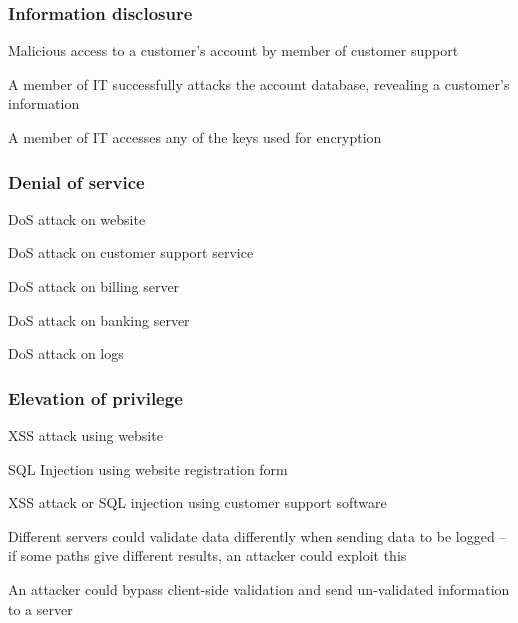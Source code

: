 \subsubsection{Information disclosure}

\begin{numbered}[resume]
    \item \label{disclosureCustomerSupport} Malicious access to a customer's account by member of customer support
    
    \item \label{disclosureItDetails} A member of IT successfully attacks the account database, revealing a customer's information

    \item \label{disclosureItKeys} A member of IT accesses any of the keys used for encryption
\end{numbered}

\subsubsection{Denial of service}

\begin{numbered}[resume]
    \item \label{dosWebsite} DoS attack on website
    \item \label{dosCustomerSupport} DoS attack on customer support service
    \item \label{dosBillingServer} DoS attack on billing server
    \item \label{dosBankingServer} DoS attack on banking server
    \item \label{dosLogs} DoS attack on logs
\end{numbered}

\subsubsection{Elevation of privilege}

\begin{numbered}[resume]
    \item \label{eopXss} XSS attack using website
    \item \label{eopSqlInjection} SQL Injection using website registration form
    \item \label{eopCustomerSupport} XSS attack or SQL injection using customer support software
    \item \label{eopValidationDifference} Different servers could validate data differently when sending data to be logged – if some paths give different results, an attacker could exploit this
    \item \label{eopClientSideValidation} An attacker could bypass client-side validation and send un-validated information to a server
\end{numbered}

